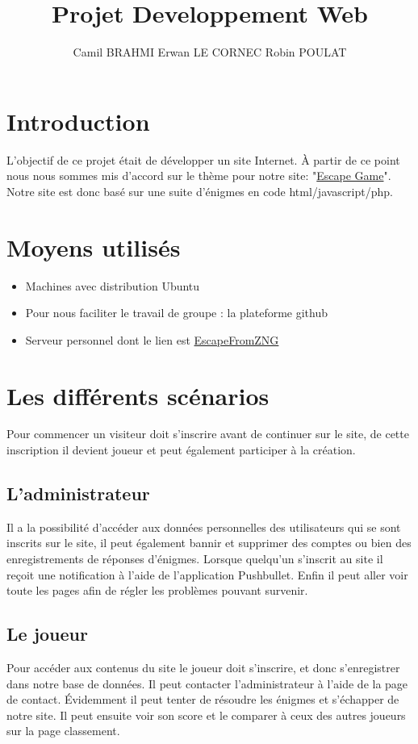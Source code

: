 \documentclass[a4paper, 11pt]{article}
\title{Projet Developpement Web}
\author{Camil BRAHMI Erwan LE CORNEC Robin POULAT}
\begin{document}
\maketitle

\newpage
\tableofcontents

\newpage
\section{Introduction}
  L'objectif de ce projet était de développer un site Internet. À partir de ce point nous nous sommes mis d'accord sur le thème pour notre site: "\underline{Escape Game}". Notre site est donc basé sur une suite d'énigmes en code html/javascript/php.
  

\section{Moyens utilisés}
\begin{itemize}
\item Machines avec distribution Ubuntu
\item Pour nous faciliter le travail de groupe : la plateforme github
\item Serveur personnel dont le lien est \href{https://zngairone.tk}{EscapeFromZNG}
\end{itemize}


\section{Les différents scénarios}
Pour commencer un visiteur doit s'inscrire avant de continuer sur le site, de cette inscription il devient joueur et peut également participer à la création.

\subsection{L'administrateur}
Il a la possibilité d'accéder aux données personnelles des utilisateurs qui se sont inscrits sur le site, il peut également bannir et supprimer des comptes ou bien des enregistrements de réponses d'énigmes.
Lorsque quelqu'un s'inscrit au site il reçoit une notification à l'aide de l'application Pushbullet.
Enfin il peut aller voir toute les pages afin de régler les problèmes pouvant survenir.

\subsection{Le joueur}
Pour accéder aux contenus du site le joueur doit s'inscrire, et donc s'enregistrer dans notre base de données. Il peut contacter l’administrateur à l'aide de la page de contact. Évidemment il peut tenter de résoudre les énigmes et s'échapper de notre site. Il peut ensuite voir son score et le comparer à ceux des autres joueurs sur la page classement.
\end{document}

